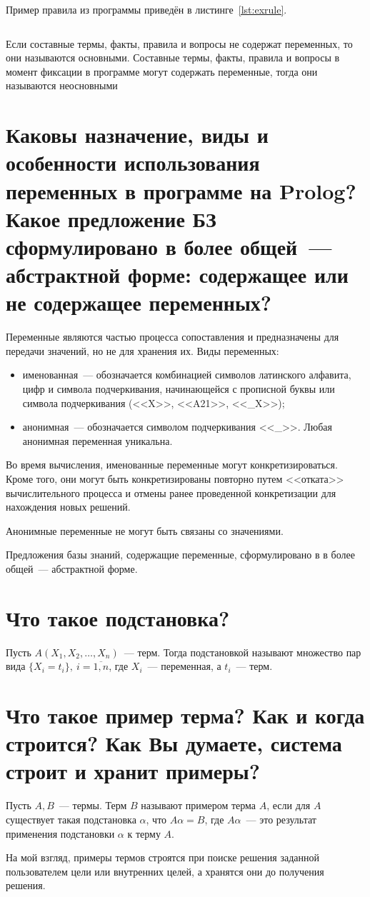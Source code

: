 Пример правила из программы приведён в листинге~\ref{lst:exrule}.
\begin{lstlisting}[caption={Пример правила},label=lst:exrule]
\end{lstlisting}

Если составные термы, факты, правила и вопросы не содержат переменных, то они называются основными. Составные термы, факты, правила и вопросы в момент фиксации в программе могут содержать переменные, тогда они называются неосновными

\section{Каковы назначение, виды и особенности использования переменных в программе на Prolog? Какое предложение БЗ сформулировано в более общей~--- абстрактной форме: содержащее или не содержащее переменных?}
Переменные являются частью процесса сопоставления и предназначены для передачи значений, но не для хранения их. Виды переменных:
\begin{itemize}
    \item именованная~--- обозначается комбинацией символов латинского алфавита, цифр и символа подчеркивания, начинающейся с прописной буквы или символа подчеркивания (<<X>>, <<A21>>, <<\_X>>);
    \item анонимная~--- обозначается символом подчеркивания <<\_>>. Любая анонимная переменная уникальна.
\end{itemize}

Во время вычисления, именованные переменные могут конкретизироваться. Кроме того, они могут быть конкретизированы повторно путем <<отката>> вычислительного процесса и отмены ранее проведенной конкретизации для нахождения новых решений.

Анонимные переменные не могут быть связаны со значениями.

Предложения базы знаний, содержащие переменные, сформулировано в в более общей~--- абстрактной форме.

\section{Что такое подстановка?}
Пусть $A(X_1, X_2, \dots, X_n)$~--- терм. Тогда подстановкой называют множество пар вида $\{X_i = t_i\},\ i = \overline{1,n}$, где $X_i$~--- переменная, а $t_i$~--- терм.

\section{Что такое пример терма? Как и когда строится? Как Вы думаете, система строит и хранит примеры?}

Пусть $A, B$~--- термы. Терм $B$ называют примером терма $A$, если для $A$ существует такая подстановка $\alpha$, что $A\alpha= B$, где $A\alpha$~--- это результат применения подстановки $\alpha$ к терму $A$.

На мой взгляд, примеры термов строятся при поиске решения заданной пользователем цели или внутренних целей, а хранятся они до получения решения.

